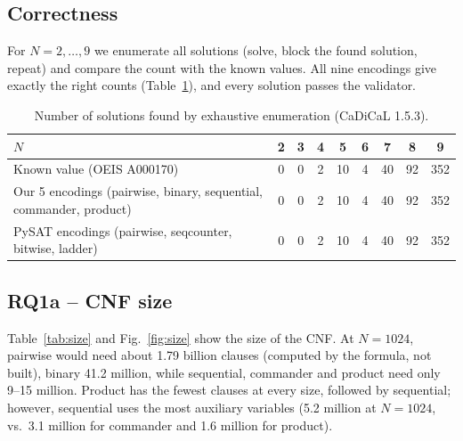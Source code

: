 \documentclass[a4paper,fleqn]{cas-sc}
\begin{document}
\subsection{Correctness}\label{sec:correct}
For $N=2,\dots,9$ we enumerate all solutions (solve, block the found solution, repeat) and compare the count with the known values. All nine encodings give exactly the right counts (Table~\ref{tab:count}), and every solution passes the validator.

\begin{table}[pos=htbp]
\caption{Number of solutions found by exhaustive enumeration (CaDiCaL 1.5.3).}\label{tab:count}
\centering
\begin{tabular}{lcccccccc}
\toprule
$N$ & 2 & 3 & 4 & 5 & 6 & 7 & 8 & 9 \\
\midrule
Known value (OEIS A000170) & 0 & 0 & 2 & 10 & 4 & 40 & 92 & 352 \\
Our 5 encodings (pairwise, binary, sequential, commander, product) & 0 & 0 & 2 & 10 & 4 & 40 & 92 & 352 \\
PySAT encodings (pairwise, seqcounter, bitwise, ladder) & 0 & 0 & 2 & 10 & 4 & 40 & 92 & 352 \\
\bottomrule
\end{tabular}
\end{table}

\subsection{RQ1a -- CNF size}
Table~\ref{tab:size} and Fig.~\ref{fig:size} show the size of the CNF. At $N=1024$, pairwise would need about 1.79 billion clauses (computed by the formula, not built), binary 41.2 million, while sequential, commander and product need only 9--15 million. Product has the fewest clauses at every size, followed by sequential; however, sequential uses the most auxiliary variables (5.2 million at $N=1024$, vs.\ 3.1 million for commander and 1.6 million for product).
\end{document}

